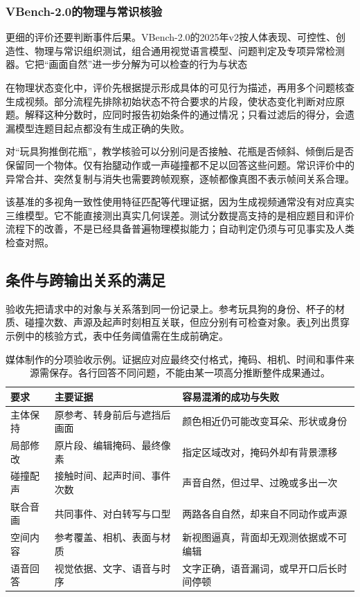 \Needspace{65mm}
\subsubsection{VBench-2.0的物理与常识核验}
\label{sec:vision-generation-physics-check}
\label{sec:vision-multigen-vbench2}

更细的评价还要判断事件后果。VBench-2.0的2025年v2按人体表现、可控性、创造性、物理与常识组织测试，组合通用视觉语言模型、问题判定及专项异常检测器。它把“画面自然”进一步分解为可以检查的行为与状态

在物理状态变化中，评价先根据提示形成具体的可见行为描述，再用多个问题核查生成视频。部分流程先排除初始状态不符合要求的片段，使状态变化判断对应原题。解释这种分数时，应同时报告初始条件的通过情况；只看过滤后的得分，会遗漏模型连题目起点都没有生成正确的失败。

对“玩具狗推倒花瓶”，教学核验可以分别问是否接触、花瓶是否倾斜、倾倒后是否保留同一个物体。仅有抬腿动作或一声碰撞都不足以回答这些问题。常识评价中的异常合并、突然复制与消失也需要跨帧观察，逐帧都像真图不表示帧间关系合理。

该基准的多视角一致性使用特征匹配等代理证据，因为生成视频通常没有对应真实三维模型。它不能直接测出真实几何误差。测试分数提高支持的是相应题目和评价流程下的改善，不是已经具备普遍物理模拟能力；自动判定仍须与可见事实及人类检查对照。

\subsection{条件与跨输出关系的满足}
\label{sec:vision-multigen-relations}

验收先把请求中的对象与关系落到同一份记录上。参考玩具狗的身份、杯子的材质、碰撞次数、声源及起声时刻相互关联，但应分别有可检查对象。表\ref{tab:vision-media-acceptance}列出贯穿示例中的核验方式，表中任务阈值需在生成前确定。

\begin{table}[htbp]
 \centering
 \small
 \begin{tabularx}{\linewidth}{@{}p{25mm}p{44mm}X@{}}
  \toprule
  要求 & 主要证据 & 容易混淆的成功与失败 \\
  \midrule
  主体保持 & 原参考、转身前后与遮挡后画面 & 颜色相近仍可能改变耳朵、形状或身份 \\
  局部修改 & 原片段、编辑掩码、最终像素 & 指定区域改对，掩码外却有背景漂移 \\
  碰撞配声 & 接触时间、起声时间、事件次数 & 声音自然，但过早、过晚或多出一次 \\
  联合音画 & 共同事件、对白转写与口型 & 两路各自自然，却来自不同动作或声源 \\
  空间内容 & 参考覆盖、相机、表面与材质 & 新视图逼真，背面却无观测依据或不可编辑 \\
  语音回答 & 视觉依据、文字、语音与时序 & 文字正确，语音漏词，或早开口后长时间停顿 \\
  \bottomrule
 \end{tabularx}
 \caption{媒体制作的分项验收示例。证据应对应最终交付格式，掩码、相机、时间和事件来源需保存。各行回答不同问题，不能由某一项高分推断整件成果通过。}
 \label{tab:vision-media-acceptance}
\end{table}
\FloatBarrier

